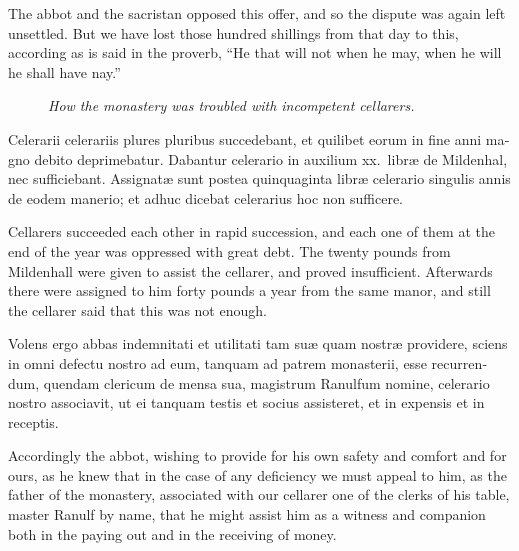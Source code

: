 \documentclass[10pt]{book}
\newcommand{\blockhead}[4][]{
\begin{figure}
\centering
\vspace{#4}
\parbox{2.75cm}{\begin{center}\footnotesize \color{BrickRed} \emph{#2}\\ #1 \end{center}}
\end{figure}
}
\begin{document}
\begin{paracol}{2}
\switchcolumn

The abbot and the sacristan opposed this offer, and so the dispute was again left unsettled. But we have lost those hundred shillings from that day to this, according as is said in the proverb, ``He that will not when he may, when he will he shall have nay.''

\switchcolumn*

\begin{otherlanguage}{latin}
\blockhead{How the monastery was troubled with incompetent cellarers.}{4}{-.45cm}
Celerarii celerariis plures pluribus succedebant, et quilibet eorum in fine anni magno debito deprimebatur. Dabantur celerario in auxilium xx.\ libr\ae{} de Mildenhal, nec sufficiebant. Assignat\ae{} sunt postea quinquaginta libr\ae{} celerario singulis annis de eodem manerio; et adhuc dicebat celerarius hoc non sufficere.

\end{otherlanguage}

\switchcolumn

Cellarers succeeded each other in rapid succession, and each one of them at the end of the year was oppressed with great debt. The twenty pounds from Mildenhall were given to assist the cellarer, and proved insufficient. Afterwards there were assigned to him forty pounds a year from the same manor, and still the cellarer said that this was not enough.

\switchcolumn*

\begin{otherlanguage}{latin}
Volens ergo abbas indemnitati et utilitati tam su\ae{} quam nostr\ae{} providere, sciens in omni defectu nostro ad eum, tanquam ad patrem monasterii, esse recurrendum, quendam clericum de mensa sua, magistrum Ranulfum nomine, celerario nostro associavit, ut ei tanquam testis et socius assisteret, et in expensis et in receptis.
\end{otherlanguage}

\switchcolumn

Accordingly the abbot, wishing to provide for his own safety and comfort and for ours, as he knew that in the case of any deficiency we must appeal to him, as the father of the monastery, associated with our cellarer one of the clerks of his table, master Ranulf by name, that he might assist him as a witness and companion both in the paying out and in the receiving of money.

\switchcolumn*


\end{paracol}
\end{document}
